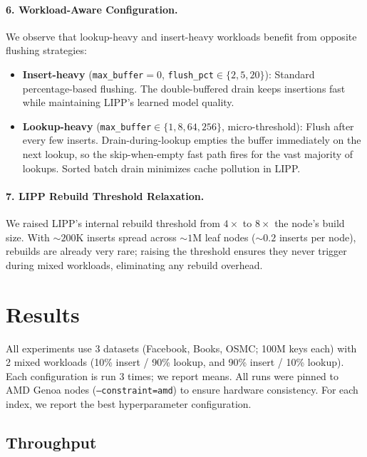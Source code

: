 \documentclass[11pt]{article}
\begin{document}
\paragraph{6. Workload-Aware Configuration.}
We observe that lookup-heavy and insert-heavy workloads benefit from opposite flushing strategies:
\begin{itemize}[nosep]
    \item \textbf{Insert-heavy} (\texttt{max\_buffer}$= 0$, \texttt{flush\_pct}$\in\{2,5,20\}$): Standard percentage-based flushing. The double-buffered drain keeps insertions fast while maintaining LIPP's learned model quality.
    \item \textbf{Lookup-heavy} (\texttt{max\_buffer}$\in\{1,8,64,256\}$, micro-threshold): Flush after every few inserts. Drain-during-lookup empties the buffer immediately on the next lookup, so the skip-when-empty fast path fires for the vast majority of lookups. Sorted batch drain minimizes cache pollution in LIPP.
\end{itemize}

\paragraph{7. LIPP Rebuild Threshold Relaxation.}
We raised LIPP's internal rebuild threshold from $4\times$ to $8\times$ the node's build size. With ${\sim}200$K inserts spread across ${\sim}1$M leaf nodes (${\sim}0.2$ inserts per node), rebuilds are already very rare; raising the threshold ensures they never trigger during mixed workloads, eliminating any rebuild overhead.

\section{Results}

All experiments use 3 datasets (Facebook, Books, OSMC; 100M keys each) with 2 mixed workloads (10\% insert / 90\% lookup, and 90\% insert / 10\% lookup). Each configuration is run 3 times; we report means. All runs were pinned to AMD Genoa nodes (\texttt{--constraint=amd}) to ensure hardware consistency. For each index, we report the best hyperparameter configuration.

\subsection{Throughput}
\end{document}

